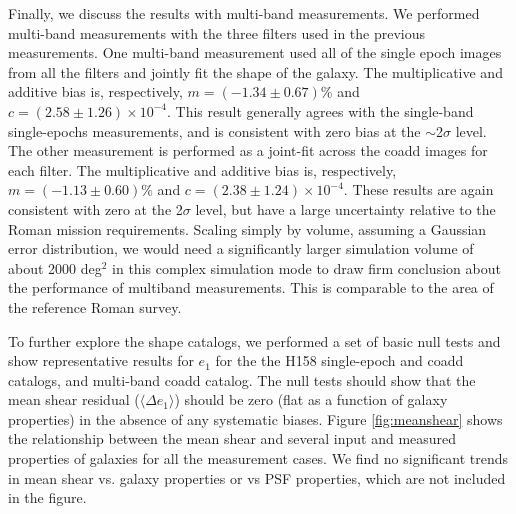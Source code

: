 \documentclass[fleqn,usenatbib]{mnras}
\begin{document}
Finally, we discuss the results with multi-band measurements. We performed multi-band measurements with the three filters used in the previous measurements. One multi-band measurement used all of the single epoch images from all the filters and jointly fit the shape of the galaxy. The multiplicative and additive bias is, respectively, $m=(-1.34\pm0.67)$\% and $c=(2.58\pm1.26)\times10^{-4}$. This result generally agrees with the single-band single-epochs measurements, and is consistent with zero bias at the $\sim$2$\sigma$ level. The other measurement is performed as a joint-fit across the coadd images for each filter. The multiplicative and additive bias is, respectively, $m=(-1.13\pm0.60)\%$ and $c=(2.38\pm1.24)\times10^{-4}$. These results are again consistent with zero at the 2$\sigma$ level, but have a large uncertainty relative to the Roman mission requirements. Scaling simply by volume, assuming a Gaussian error distribution, we would need a significantly larger simulation volume of about 2000 \textrm{deg}$^2$ in this complex simulation mode to draw firm conclusion about the performance of multiband measurements. This is comparable to the area of the reference Roman survey.

To further explore the shape catalogs, we performed a set of basic null tests and show representative results for $e_1$ for the the H158 single-epoch and coadd catalogs, and multi-band coadd catalog. The null tests should show that the mean shear residual ($\langle \Delta e_{1} \rangle$) should be zero (flat as a function of galaxy properties) in the absence of any systematic biases. Figure \ref{fig:meanshear} shows the relationship between the mean shear and several input and measured properties of galaxies for all the measurement cases. We find no significant trends in mean shear vs. galaxy properties or vs PSF properties, which are not included in the figure. 
\end{document}

